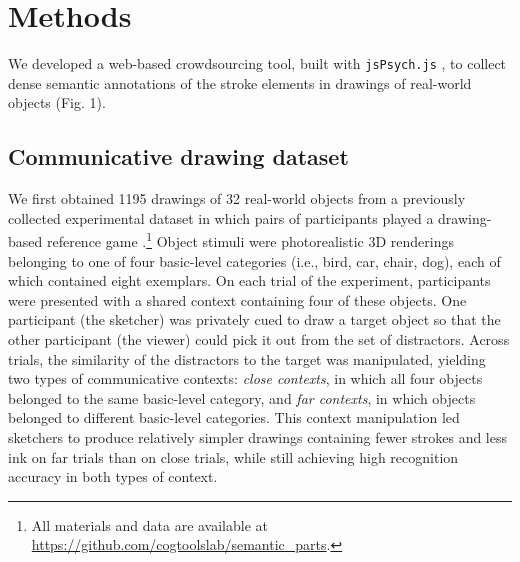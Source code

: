 \documentclass[10pt,letterpaper]{article}
\newcommand{\kushin}[1]{{\color{orange}{[kushin: #1]}}}
\begin{document}
\section{Methods}

We developed a web-based crowdsourcing tool, built with \texttt{jsPsych.js} \cite{deLeeuw2015}, to collect dense semantic annotations of the stroke elements in drawings of real-world objects (Fig. 1).

\subsection{Communicative drawing dataset}
We first obtained 1195 drawings of 32 real-world objects from a previously collected experimental dataset in which pairs of participants played a drawing-based reference game \cite{fan2019pragmatic}.\footnote{All materials and data are available at \url{https://github.com/cogtoolslab/semantic_parts}.}
Object stimuli were photorealistic 3D renderings belonging to one of four basic-level categories (i.e., bird, car, chair, dog), each of which contained eight exemplars. %
On each trial of the experiment, participants were presented with a shared context containing four of these objects. 
One participant (the sketcher) was privately cued to draw a target object so that the other participant (the viewer) could pick it out from the set of distractors. %
Across trials, the similarity of the distractors to the target was manipulated, yielding two types of communicative contexts: \textit{close contexts}, in which all four objects belonged to the same basic-level category, and \textit{far contexts}, in which objects belonged to different basic-level categories. %
This context manipulation led sketchers to produce relatively simpler drawings containing fewer strokes and less ink on far trials than on close trials, while still achieving high recognition accuracy in both types of context.

 
\end{document}
